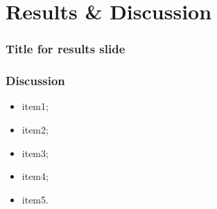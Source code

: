 \section[Cap1]{Results \& Discussion}

\begin{frame}
\frametitle{Title for results slide}

\end{frame}

\begin{frame}
    \frametitle{Discussion}
    \begin{itemize}
        \item item1;
        \item item2;
        \item item3;
        \item item4;
        \item item5.
    \end{itemize}
\end{frame}



